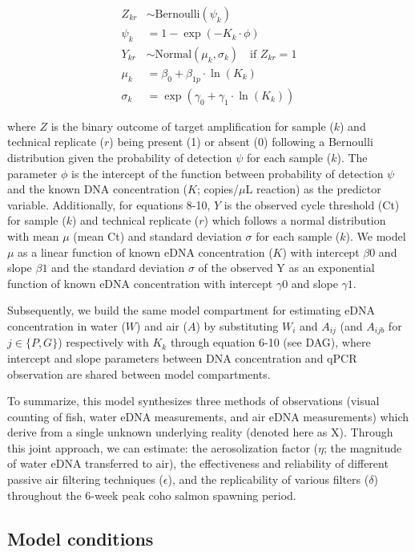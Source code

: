 \documentclass{article}
\begin{document}
\begin{align}
    Z_{kr} &\sim \mathrm{Bernoulli} \left(\psi_{k}\right)  \\
    \psi_{k} &= 1 - \exp(-K_{k} \cdot \phi) \\
    Y_{kr} &\sim \mathrm{Normal} (\mu_{k}, \sigma_{k}) \quad \text{if } Z_{kr} = 1 \\
    \mu_{k} &= \beta_0 + \beta_{1p} \cdot \ln (K_{k}) \\
    \sigma_{k} &= \exp(\gamma_0 + \gamma_1 \cdot \ln (K_{k}))
\end{align}

where $Z$ is the binary outcome of target amplification for sample ($k$) and technical replicate ($r$) being present (1) or absent (0) following a Bernoulli distribution given the probability of detection $\psi$ for each sample ($k$). The parameter $\phi$ is the intercept of the function between probability of detection $\psi$ and the known DNA concentration ($K$; copies/$\mu$L reaction) as the predictor variable. Additionally, for equations 8-10, $Y$ is the observed cycle threshold (Ct) for sample ($k$) and technical replicate ($r$) which follows a normal distribution with mean $\mu$ (mean Ct) and standard deviation $\sigma$ for each sample ($k$). We model $\mu$ as a linear function of known eDNA concentration ($K$) with intercept $\beta0$ and slope $\beta1$ and the standard deviation $\sigma$ of the observed Y as an exponential function of known eDNA concentration with intercept $\gamma0$ and slope $\gamma1$.

Subsequently, we build the same model compartment for estimating eDNA concentration in water ($W$) and air ($A$) by substituting $W_i$ and $A_{ij}$ (and $A_{ijb}$ for $j \in \{P,G\}$) respectively with $K_k$ through equation 6-10 (see DAG), where intercept and slope parameters between DNA concentration and qPCR observation are shared between model compartments.

To summarize, this model synthesizes three methods of observations (visual counting of fish, water eDNA measurements, and air eDNA measurements) which derive from a single unknown underlying reality (denoted here as X). Through this joint approach, we can estimate: the aerosolization factor ($\eta$; the magnitude of water eDNA transferred to air), the effectiveness and reliability of different passive air filtering techniques ($\epsilon$), and the replicability of various filters ($\delta$) throughout the 6-week peak coho salmon spawning period.

\subsection{Model conditions}
\end{document}
